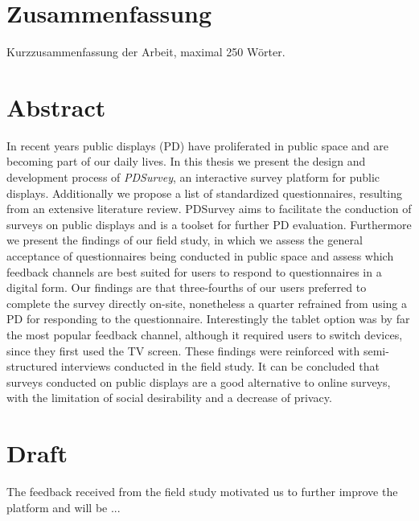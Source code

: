 
\section*{Zusammenfassung}

	Kurzzusammenfassung der Arbeit, maximal 250 W\"orter.

\section*{Abstract}

	In recent years public displays (PD) have proliferated in public space and are becoming part of our daily lives. In this thesis we present the design and development process of \textit{PDSurvey}, an interactive survey platform for public displays. Additionally we propose a list of standardized questionnaires, resulting from an extensive literature review. PDSurvey aims to facilitate the conduction of surveys on public displays and is a toolset for further PD evaluation. Furthermore we present the findings of our field study, in which we assess the general acceptance of questionnaires being conducted in public space and assess which feedback channels are best suited for users to respond to questionnaires in a digital form.
	Our findings are that three-fourths of our users preferred to complete the survey directly on-site, nonetheless a quarter refrained from using a PD for responding to the questionnaire. Interestingly the tablet option was by far the most popular feedback channel, although it required users to switch devices, since they first used the TV screen. These findings were reinforced with semi-structured interviews conducted in the field study.
	It can be concluded that surveys conducted on public displays are a good alternative to online surveys, with the limitation of social desirability and a decrease of privacy.









\section*{Draft}

	The feedback received from the field study motivated us to further improve the platform and will be ...

